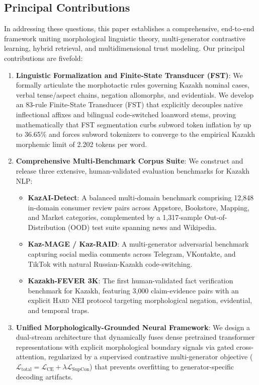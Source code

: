 \subsection{Principal Contributions}
In addressing these questions, this paper establishes a comprehensive, end-to-end framework uniting morphological linguistic theory, multi-generator contrastive learning, hybrid retrieval, and multidimensional trust modeling. Our principal contributions are fivefold:
\begin{enumerate}
    \item \textbf{Linguistic Formalization and Finite-State Transducer (FST)}: We formally articulate the morphotactic rules governing Kazakh nominal cases, verbal tense/aspect chains, negation allomorphs, and evidentials. We develop an 83-rule Finite-State Transducer (FST) that explicitly decouples native inflectional affixes and bilingual code-switched loanword stems, proving mathematically that FST segmentation curbs subword token inflation by up to 36.65\% and forces subword tokenizers to converge to the empirical Kazakh morphemic limit of 2.202 tokens per word.
    \item \textbf{Comprehensive Multi-Benchmark Corpus Suite}: We construct and release three extensive, human-validated evaluation benchmarks for Kazakh NLP:
    \begin{itemize}
        \item \textbf{KazAI-Detect}: A balanced multi-domain benchmark comprising 12,848 in-domain consumer review pairs across Appstore, Bookstore, Mapping, and Market categories, complemented by a 1,317-sample Out-of-Distribution (OOD) test suite spanning news and Wikipedia.
        \item \textbf{Kaz-MAGE / Kaz-RAID}: A multi-generator adversarial benchmark capturing social media comments across Telegram, VKontakte, and TikTok with natural Russian-Kazakh code-switching.
        \item \textbf{Kazakh-FEVER 3K}: The first human-validated fact verification benchmark for Kazakh, featuring 3,000 claim-evidence pairs with an explicit \textsc{Hard NEI} protocol targeting morphological negation, evidential, and temporal traps.
    \end{itemize}
    \item \textbf{Unified Morphologically-Grounded Neural Framework}: We design a dual-stream architecture that dynamically fuses dense pretrained transformer representations with explicit morphological boundary signals via gated cross-attention, regularized by a supervised contrastive multi-generator objective ($\mathcal{L}_{\text{total}} = \mathcal{L}_{\text{CE}} + \lambda \mathcal{L}_{\text{SupCon}}$) that prevents overfitting to generator-specific decoding artifacts.

\end{enumerate}
